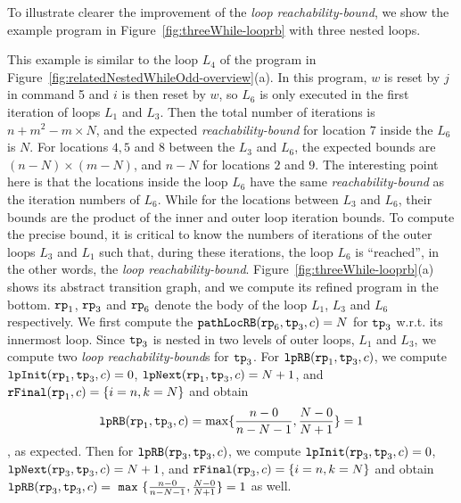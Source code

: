 To illustrate clearer the improvement of the \emph{loop reachability-bound},
we show the example program in Figure~\ref{fig:threeWhile-looprb} with three nested loops.

This example is similar to the loop $L_4$ of the program in Figure~\ref{fig:relatedNestedWhileOdd-overview}(a).
In this program, $w$ is reset by $j$ in command 5 and $i$ is then reset by $w$, so $L_6$ is only executed in the first iteration of loops $L_1$ and $L_3$.
Then the total number of iterations is
$n + m^2 - m \times N$,
and the expected \emph{reachability-bound} for location $7$ inside the $L_6$ is $N$.
For locations $4, 5$ and $8$ between the $L_3$ and $L_6$,
the expected bounds are $(n-N) \times (m - N)$,
and $n - N$ for locations $2$ and $9$.
The interesting point here is that the locations inside the loop $L_6$ have the same
\emph{reachability-bound} as the iteration numbers of $L_6$.
While for the locations between $L_3$ and $L_6$, their bounds are the product of the inner and outer loop iteration bounds.
To compute the precise bound, it is critical to know
the numbers of iterations of the outer loops $L_3$ and $L_1$ such that,
during these iterations, the loop $L_6$ is ``reached'',
in the other words, the \emph{loop reachability-bound}.
Figure~\ref{fig:threeWhile-looprb}(a) shows its abstract transition graph,
and we compute its refined program in the bottom. 
$\mathtt{rp}_1$, $\mathtt{rp}_3$ and $\mathtt{rp}_6$ denote the body of the loop $L_1$, $L_3$ and $L_6$ respectively.
We first compute the $\mathtt{pathLocRB}(\mathtt{rp}_6, \mathtt{tp}_3, c) = N $ for $\mathtt{tp}_3$ w.r.t. its innermost loop.
Since $\mathtt{tp}_3$ is nested in two levels of outer loops, $L_1$ and $L_3$,
we compute two \emph{loop reachability-bound}s for $\mathtt{tp}_3$.
For $\mathtt{lpRB}(\mathtt{rp}_1, \mathtt{tp}_3, c)$,
we compute $\mathtt{lpInit}( \mathtt{rp}_1, \mathtt{tp}_3, c) = 0$,
$\mathtt{lpNext}( \mathtt{rp}_1, \mathtt{tp}_3, c) = N + 1 $, and
$\mathtt{rFinal}(\mathtt{rp}_1, c) = \{ i = n, k = N \}$ and obtain
$$ \mathtt{lpRB}(\mathtt{rp}_1, \mathtt{tp}_3, c) = \max\{ \frac{n - 0}{n - N - 1}, \frac{N - 0}{N + 1} \} = 1 $$, as expected.
Then for $\mathtt{lpRB}(\mathtt{rp}_3, \mathtt{tp}_3, c)$,
we compute $\mathtt{lpInit}( \mathtt{rp}_3, \mathtt{tp}_3, c) = 0$,
$\mathtt{lpNext}( \mathtt{rp}_3, \mathtt{tp}_3, c) = N + 1 $, and
$\mathtt{rFinal}(\mathtt{rp}_3, c) = \{ i = n, k = N \}$ and obtain
$\mathtt{lpRB}(\mathtt{rp}_3, \mathtt{tp}_3, c) = ~\mathtt{max}~\{ \frac{n - 0}{n - N - 1}, \frac{N - 0}{N + 1}\} = 1$ as well.


